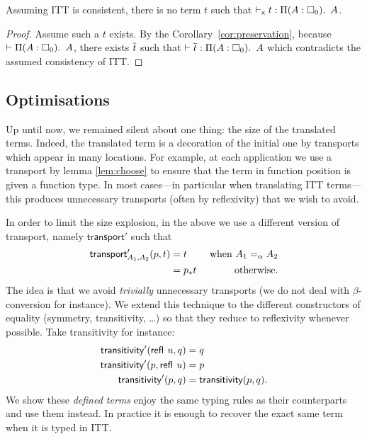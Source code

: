 \begin{corollary}
  \label{cor:consistency}
  Assuming ITT is consistent, there is no term $t$ such that
  $\vdash_{\mathsf{x}} t : \mathop{\Pi(A:\square_{0}).\ }{A}$.
\end{corollary}

\begin{proof}
  Assume such a $t$ exists. By the Corollary~\ref{cor:preservation},
  because $\vdash \mathop{\Pi(A:\square_{0}).\ }{A}$,
  there exists $\overline{t}$ such that $\vdash \overline{t} : \mathop{\Pi(A:\square_{0}).\ }{A}$ which
  contradicts the assumed consistency of ITT.
\end{proof}

\subsection{Optimisations}
\label{sec:optim}

Up until now, we remained silent about one thing: the size of the
translated terms. Indeed, the translated term is a decoration of the
initial one by transports which appear in many locations. For example,
at each application we use a transport by lemma \ref{lem:choose} to
ensure that the term in function position is given a function type. In
most cases---in particular when translating ITT terms---this produces
unnecessary transports (often by reflexivity) that we wish to avoid.

In order to limit the size explosion, in the above we use a different version of
transport, namely $\mathsf{transport}'$ such that
%
\begin{align*}
  \mathsf{transport}'_{A_1,A_2}(p,t) &= t &\text{ when } A_1 =_\alpha A_2 \\
  &= p_*{t} &\text{ otherwise.}
\end{align*}
%
The idea is that we avoid \emph{trivially} unnecessary transports (we do not
deal with $\beta$-conversion for instance).
We extend this technique to the different constructors of equality (symmetry,
transitivity, \dots) so that they reduce to reflexivity whenever possible.
Take transitivity for instance:
%
\begin{align*}
  \mathsf{transitivity}'({\mathsf{refl}}_{}\  u,q) &= q \\
  \mathsf{transitivity}'(p,{\mathsf{refl}}_{}\  u) &= p \\
  \mathsf{transitivity}'(p,q) &= \mathsf{transitivity}(p,q).
\end{align*}
%
We show these \emph{defined terms} enjoy the same typing rules as their
counterparts and use them instead.
In practice it is enough to recover the exact same term when it is typed in ITT.

